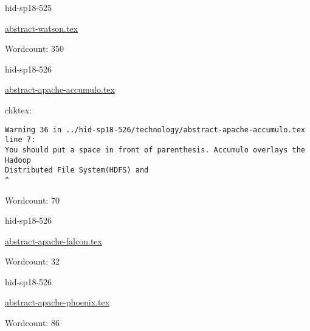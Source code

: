 

\begin{IU}

hid-sp18-525

\href{https://github.com/cloudmesh-community/hid-sp18-525/blob/master//technology/abstract-watson.tex}{abstract-watson.tex}

 

Wordcount: 350

\end{IU}



\begin{IU}

hid-sp18-526

\href{https://github.com/cloudmesh-community/hid-sp18-526/blob/master//technology/abstract-apache-accumulo.tex}{abstract-apache-accumulo.tex}

 
chktex:
\begin{tiny}
\begin{verbatim}
Warning 36 in ../hid-sp18-526/technology/abstract-apache-accumulo.tex line 7:
You should put a space in front of parenthesis. Accumulo overlays the Hadoop
Distributed File System(HDFS) and
^
\end{verbatim}
\end{tiny}

Wordcount: 70

\end{IU}



\begin{IU}

hid-sp18-526

\href{https://github.com/cloudmesh-community/hid-sp18-526/blob/master//technology/abstract-apache-falcon.tex}{abstract-apache-falcon.tex}

 

Wordcount: 32

\end{IU}



\begin{IU}

hid-sp18-526

\href{https://github.com/cloudmesh-community/hid-sp18-526/blob/master//technology/abstract-apache-phoenix.tex}{abstract-apache-phoenix.tex}

 

Wordcount: 86

\end{IU}

